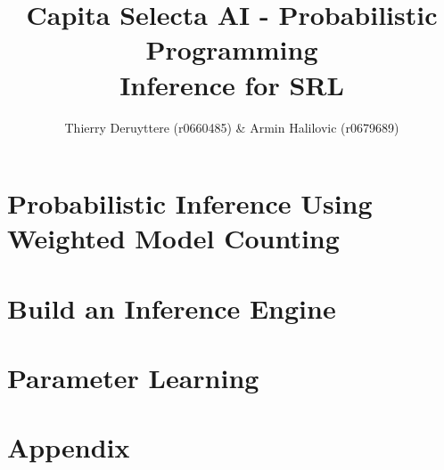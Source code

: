 \documentclass[a4paper,10pt]{report}
\title{Capita Selecta AI - Probabilistic Programming\\Inference for SRL}
\author{Thierry Deruyttere (r0660485) \& Armin Halilovic (r0679689) }
\begin{document}
\maketitle
\chapter{Probabilistic Inference Using Weighted Model Counting}


\chapter{Build an Inference Engine}


\chapter{Parameter Learning}


\chapter{Appendix}

\end{document}
